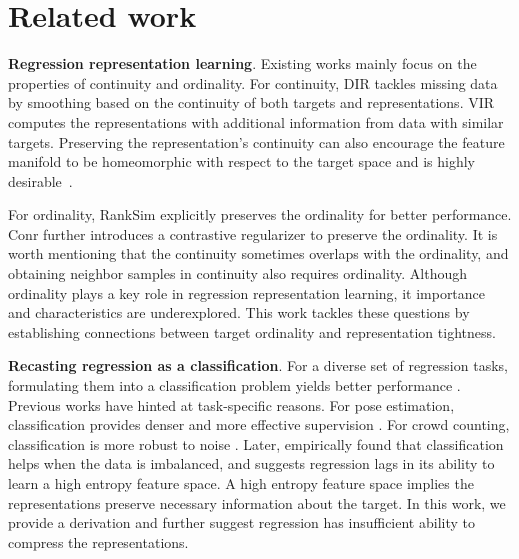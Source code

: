 \section{Related work}
\textbf{Regression representation learning}. 
Existing works mainly focus on the properties of continuity and ordinality. For continuity, DIR \citep{yang2021delving} tackles missing data by smoothing based on the continuity of both targets and representations.  VIR \citep{wang2024variational} computes the representations with additional information from data with similar targets. 
Preserving the representation's continuity  can also encourage the feature manifold to be homeomorphic with respect to the target space and is highly desirable~\citep{zhang2024deep}. 

For ordinality, RankSim \citep{gong2022ranksim} explicitly preserves the ordinality for better performance. Conr \citep{keramati2023conr} further introduces a contrastive regularizer to preserve the ordinality. It is worth mentioning that the continuity sometimes overlaps with the ordinality, and obtaining neighbor samples in continuity also requires ordinality. Although ordinality plays a key role in regression representation learning, it importance and 
characteristics are underexplored.  
This work tackles these questions by establishing connections between target ordinality and representation tightness.

\textbf{Recasting regression as a classification}. For a diverse set of regression tasks, formulating them into a classification problem yields better performance \citep{li2022simcc, bhat2021adabins, farebrother2024stop}. Previous works have hinted at task-specific reasons. For pose estimation, classification provides denser and more effective supervision \citep{gu2022dive}. For crowd counting, classification is more robust to noise \citep{xiong2022discrete}. Later, \citet{pintea2023step} empirically found that classification helps when the data is imbalanced, and \citet{zhang2023improving} suggests regression lags in its ability to learn a high entropy feature space. A high entropy feature space implies the representations preserve necessary information about the target. In this work, we provide a derivation and further suggest regression has insufficient ability to compress the representations.